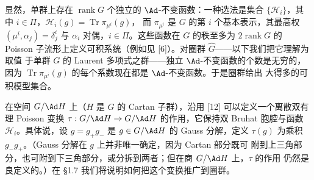 显然，单群上存在 $\operatorname{rank}G$ 个独立的 $\Ad$-不变函数：一种选法是集合
$\{\mathcal{H}_i\}$，其中 $i\in\Pi$，$\mathcal{H}_i(g)=\operatorname{Tr}\pi_{\mu^i}(g)$，
而 $\pi_{\mu^i}$ 是 $G$ 的第 $i$ 个基本表示，其最高权 $(\mu^i,\alpha_j)=\delta^i_j$
与 $\alpha_i$ 对偶，$i\in\Pi$。这些函数在 $G$ 的秩至多为 $2\operatorname{rank}G$ 的
Poisson 子流形上定义可积系统（例如见 [6]）。对圈群 $\hat G$——以下我们把它理解为取值
于单群 $G$ 的 Laurent 多项式之群——独立 $\Ad$-不变函数的个数是无穷的，因为
$\operatorname{Tr}\pi_{\mu^i}(g)$ 的每个系数现在都是 $\Ad$-不变函数。于是圈群给出
大得多的可积模型集合。

在空间 $G/\Ad H$ 上（$H$ 是 $G$ 的 Cartan 子群），沿用 [12] 可以定义一个离散双有理
Poisson 变换 $\tau:G/\Ad H\to G/\Ad H$ 的作用，它保持双 Bruhat 胞腔与函数
$\mathcal{H}_i$。具体说，设 $g=g_+g_-$ 是 $g\in G/\Ad H$ 的 Gauss 分解，定义
$\tau(g)$ 为乘积 $g_-g_+$。（Gauss 分解在 $g$ 上并非唯一确定，因为 Cartan 部分既可
附到上三角部分，也可附到下三角部分，或分拆到两者；但在商 $G/\Ad H$ 上，$\tau$ 的作用
仍然是良定义的。）在 §1.7 我们将说明如何把这个变换推广到圈群。
